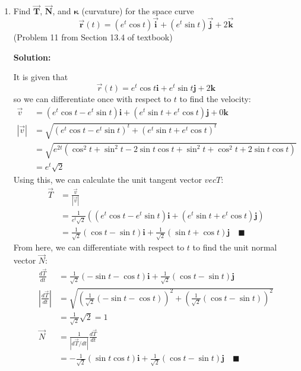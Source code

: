 \documentclass[letterpaper, 11pt]{article}
\begin{document}
\begin{enumerate}

\item Find $\vec{\bm{T}}$, $\vec{\bm{N}}$, and $\bm{\kappa}$ (curvature) for the space curve
$$\vec{\bm{r}}(t)= (e^t\cos t)\vec{\bm{i}}+(e^t \sin t)\vec{\bm{j}}+2\vec{\bm{k}}$$ 
(Problem 11 from Section 13.4 of textbook)

\par \textbf{Solution:} 
\par It is given that
\[ \vec r(t) = e^t \cos t \bm{i} + e^t \sin t \bm{j} + 2 \bm{k}\]
so we can differentiate once with respect to $t$ to find the velocity:
\begin{align*}
\vec v &= \left( e^t \cos t - e^t \sin t\right) \bm{i} + \left(e^t \sin t + e^t \cos t \right) \bm{j} + 0 \bm{k} \\
|\vec v | &= \sqrt{\left( e^t \cos t - e^t \sin t\right)^t + \left(e^t \sin t + e^t \cos t \right)^t } \\
&= \sqrt{e^{2t}\left( \cos^2 t + \sin^2 t - 2 \sin t \cos t + \sin^2 t + \cos^2 t + 2 \sin t\cos t\right)}\\
&= e^t \sqrt{2} 
\end{align*}
Using this, we can calculate the unit tangent vector $vec T$:
\begin{align*}
\vec T  &= \frac{ \vec v}{|\vec v|}\\
&= \frac{1}{e^t \sqrt{2}} \left( \left( e^t \cos t - e^t \sin t\right) \bm{i} + \left(e^t \sin t + e^t \cos t \right) \bm{j}\right) \\
&= \frac{1}{\sqrt{2}}\left( \cos t - \sin t\right) \bm{i} +  \frac{1}{\sqrt{2}}\left(\sin t + \cos t \right) \bm{j} \quad\blacksquare
\end{align*}
From here, we can differentiate with respect to $t$ to find the unit normal vector $\vec N$:
\begin{align*}
\frac{d\vec T}{dt} &= \frac{1}{\sqrt{2}}\left( -\sin t - \cos t\right) \bm{i} +  \frac{1}{\sqrt{2}}\left(\cos t -\sin t \right) \bm{j} \\
\left| \frac{d \vec T}{dt} \right| &= \sqrt{\left( \frac{1}{\sqrt{2}}\left( -\sin t - \cos t\right)\right)^2 + \left(\frac{1}{\sqrt{2}}\left(\cos t -\sin t \right)\right)^2 } \\
&= \frac{1}{\sqrt{2}} \sqrt{2} = 1\\
\vec N &= \frac{1}{|d \vec T/dt|} \frac{d\vec T}{dt} \\
&= -\frac{1}{\sqrt{2}}\left( \sin t  \cos t\right) \bm{i} +  \frac{1}{\sqrt{2}}\left(\cos t -\sin t \right) \bm{j} \quad\blacksquare

\end{align*}
\end{enumerate}
\end{document}

